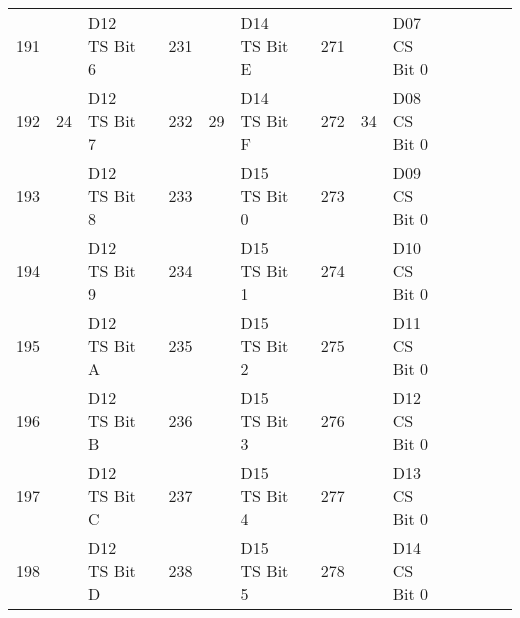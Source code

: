 \documentclass[]{article}
\begin{document}
\begin{landscape}
\begin{table}[]
\begin{tabular}{lllllllllllllll}
			191          &                      & D12 TS Bit 6      &                    & 231          &                      & D14 TS Bit E      &  & 271          &                      & D07 CS Bit 0      &  & \cellcolor[HTML]{EFEFEF} & \cellcolor[HTML]{EFEFEF}                   & \cellcolor[HTML]{EFEFEF} \\
			192          & \multirow{-8}{*}{24} & D12 TS Bit 7      &                    & 232          & \multirow{-8}{*}{29} & D14 TS Bit F      &  & 272          & \multirow{-8}{*}{34} & D08 CS Bit 0      &  & \cellcolor[HTML]{EFEFEF} & \multirow{-8}{*}{\cellcolor[HTML]{EFEFEF}} & \cellcolor[HTML]{EFEFEF} \\ \cline{1-3} \cline{5-7} \cline{9-11} \cline{13-15} 
			193          &                      & D12 TS Bit 8      &                    & 233          &                      & D15 TS Bit 0      &  & 273          &                      & D09 CS Bit 0      &  & \cellcolor[HTML]{EFEFEF} & \cellcolor[HTML]{EFEFEF}                   & \cellcolor[HTML]{EFEFEF} \\
			194          &                      & D12 TS Bit 9      &                    & 234          &                      & D15 TS Bit 1      &  & 274          &                      & D10 CS Bit 0      &  & \cellcolor[HTML]{EFEFEF} & \cellcolor[HTML]{EFEFEF}                   & \cellcolor[HTML]{EFEFEF} \\
			195          &                      & D12 TS Bit A      &                    & 235          &                      & D15 TS Bit 2      &  & 275          &                      & D11 CS Bit 0      &  & \cellcolor[HTML]{EFEFEF} & \cellcolor[HTML]{EFEFEF}                   & \cellcolor[HTML]{EFEFEF} \\
			196          &                      & D12 TS Bit B      &                    & 236          &                      & D15 TS Bit 3      &  & 276          &                      & D12 CS Bit 0      &  & \cellcolor[HTML]{EFEFEF} & \cellcolor[HTML]{EFEFEF}                   & \cellcolor[HTML]{EFEFEF} \\
			197          &                      & D12 TS Bit C      &                    & 237          &                      & D15 TS Bit 4      &  & 277          &                      & D13 CS Bit 0      &  & \cellcolor[HTML]{EFEFEF} & \cellcolor[HTML]{EFEFEF}                   & \cellcolor[HTML]{EFEFEF} \\
			198          &                      & D12 TS Bit D      &                    & 238          &                      & D15 TS Bit 5      &  & 278          &                      & D14 CS Bit 0      &  & \cellcolor[HTML]{EFEFEF} & \cellcolor[HTML]{EFEFEF}                   & \cellcolor[HTML]{EFEFEF} \\

\end{tabular}
\end{table}
\end{landscape}
\end{document}
